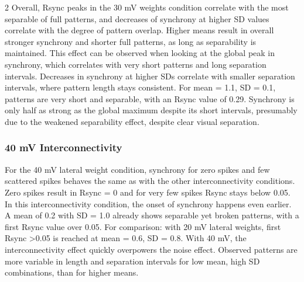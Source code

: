 \documentclass[12pt,a4paper]{article}
\begin{document}
\begin{multicols}{2}
            Overall, Rsync peaks in the 30 mV weights condition correlate with the most separable of full patterns, and decreases of synchrony at higher SD values correlate with the degree of pattern overlap. Higher means result in overall stronger synchrony and shorter full patterns, as long as separability is maintained. This effect can be observed when looking at the global peak in synchrony, which correlates with very short patterns and long separation intervals. Decreases in synchrony at higher SDs correlate with smaller separation intervals, where pattern length stays consistent. For mean = 1.1, SD = 0.1, patterns are very short and separable, with an Rsync value of 0.29. Synchrony is only half as strong as the global maximum despite its short intervals, presumably due to the weakened separability effect, despite clear visual separation.
            
        \subsubsection{40 mV Interconnectivity}
            For the 40 mV lateral weight condition, synchrony for zero spikes and few scattered spikes behaves the same as with the other interconnectivity conditions. Zero spikes result in Rsync = 0 and for very few spikes Rsync stays below 0.05. In this interconnectivity condition, the onset of synchrony happens even earlier. A mean of 0.2 with SD = 1.0 already shows separable yet broken patterns, with a first Rsync value over 0.05. For comparison: with 20 mV lateral weights, first Rsync \textgreater 0.05 is reached at mean = 0.6, SD = 0.8. With 40 mV, the interconnectivity effect quickly overpowers the noise effect. Observed patterns are more variable in length and separation intervals for low mean, high SD combinations, than for higher means.
            

\end{multicols}
\end{document}
